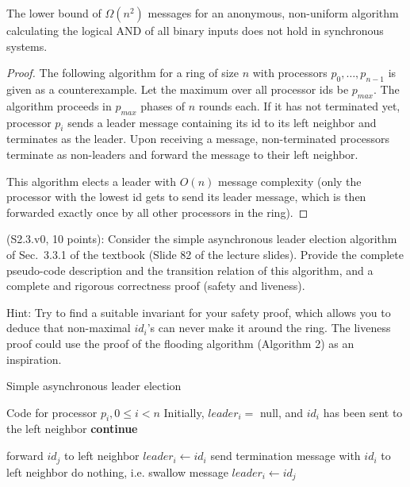\begin{theorem}
The lower bound of $\Omega(n^2)$ messages for an anonymous, non-uniform algorithm calculating the
logical AND of all binary inputs does not hold in synchronous systems.
\end{theorem}

\begin{proof}
The following algorithm for a ring of size $n$ with processors $p_0, \ldots, p_{n-1}$
is given as a counterexample. Let the maximum over all processor ids be $p_{max}$.
The algorithm proceeds in $p_{max}$ phases of $n$ rounds each.
If it has not terminated yet, processor $p_i$ sends a leader message containing its id
to its left neighbor and terminates as the leader. Upon receiving a message, non-terminated processors
terminate as non-leaders and forward the message to their left neighbor.

This algorithm elects a leader with $O(n)$ message complexity (only the processor with the lowest
id gets to send its leader message, which is then forwarded exactly once by all other processors in
the ring).
\end{proof}


\begin{Exc}{(S2.3.v0, 10 points):}
Consider the simple asynchronous leader election algorithm of Sec.~3.3.1 of
the textbook (Slide 82 of the lecture slides). Provide the complete
pseudo-code description and the transition relation of this algorithm,
and a complete and rigorous correctness proof (safety and liveness).

\normalfont
Hint: Try to find a suitable invariant for your safety proof, which allows
you to deduce that non-maximal $id_i$'s can never make it around the ring.
The liveness proof could use the proof of the flooding algorithm
(Algorithm 2) as an inspiration.
\end{Exc}

\begin{algorithm}
\caption{Simple asynchronous leader election} \label{alg:ale}
\begin{algorithmic}[1]
\Statex Code for processor $p_i, 0 \leq i < n$
\Statex Initially, $leader_i = $ null, and $id_i$ has been sent to the left neighbor
        \State \textbf{continue}
    \EndIf

        \State forward $id_j$ to left neighbor
        \State $leader_i \gets id_i$
        \State send termination message with $id_i$ to left neighbor
        \State do nothing, i.e. swallow message
        \State $leader_i \gets id_j$
    \EndIf
\EndFor
\end{algorithmic}
\end{algorithm}

